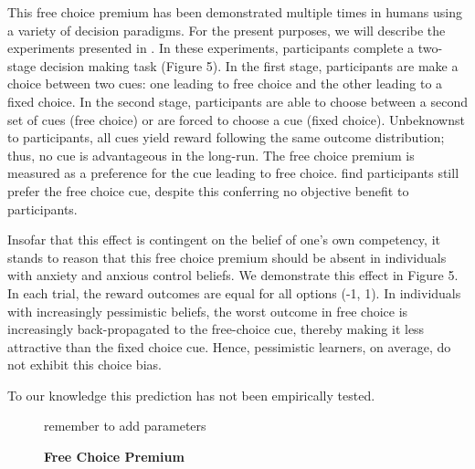 \documentclass[11pt]{article} %
\begin{document}
This free choice premium has been demonstrated multiple times in humans \citep{Suzuki1997,Leotti2011,Leotti2014,Cockburn2014} using a variety of decision
paradigms. For the present purposes, we will describe the experiments presented in
\citep{Leotti2011,Leotti2014}. In these experiments, participants complete a
two-stage decision making task (Figure 5). In the first stage, participants are
make a choice between two cues: one leading to free choice and the other leading
to a fixed choice. In the second stage, participants are able to choose between
a second set of cues (free choice) or are forced to choose a cue (fixed choice).
Unbeknownst to participants, all cues yield reward following the same outcome
distribution; thus, no cue is advantageous in the long-run. The free choice
premium is measured as a preference for the cue leading to free choice. \cite{Leotti2011,Leotti2014}
find participants still prefer the free choice cue, despite this conferring no
objective benefit to participants.

Insofar that this effect is contingent on the belief of one's own competency,
it stands to reason that this free choice premium should be absent in individuals
with anxiety and anxious control beliefs. We demonstrate this effect in Figure 5.
In each trial, the reward outcomes are equal for all options (-1, 1). In individuals
with increasingly pessimistic beliefs, the worst outcome in free choice is increasingly
back-propagated to the free-choice cue, thereby making it less attractive than
the fixed choice cue. Hence, pessimistic learners, on average, do not exhibit
this choice bias.

To our knowledge this prediction has not been empirically tested.

\begin{figure}
  \centerline{%
  }
  \caption{\textbf{Free Choice Premium}}
  \par remember to add parameters
\end{figure}
\end{document}
